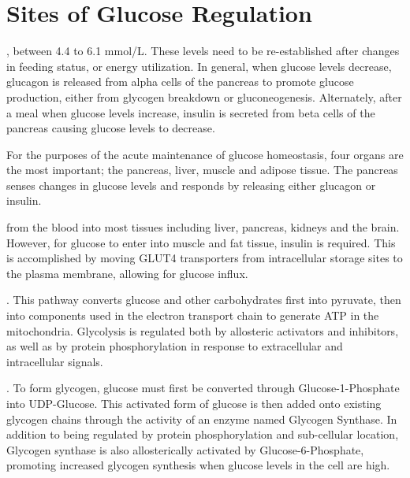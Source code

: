 \documentclass{tufte-handout}
\begin{document}
\section{Sites of Glucose Regulation}

, between 4.4 to 6.1 mmol/L.  These levels need to be re-established after changes in feeding status, or energy utilization.  In general, when glucose levels decrease, glucagon is released from alpha cells of the pancreas to promote glucose production, either from glycogen breakdown or gluconeogenesis.  Alternately, after a meal when glucose levels increase, insulin is secreted from beta cells of the pancreas causing glucose levels to decrease.

For the purposes of the acute maintenance of glucose homeostasis, four organs are the most important; the pancreas, liver, muscle and adipose tissue.  The pancreas senses changes in glucose levels and responds by releasing either glucagon or insulin. 

 from the blood into most tissues including liver, pancreas, kidneys and the brain.  However, for glucose to enter into muscle and fat tissue, insulin is required.  This is accomplished by moving GLUT4 transporters from intracellular storage sites to the plasma membrane, allowing for glucose influx.  

.  This pathway converts glucose and other carbohydrates first into pyruvate, then into components used in the electron transport chain to generate ATP in the mitochondria.  Glycolysis is regulated both by allosteric activators and inhibitors, as well as by protein phosphorylation in response to extracellular and intracellular signals.

.  To form glycogen, glucose must first be converted through Glucose-1-Phosphate into UDP-Glucose.  This activated form of glucose is then added onto existing glycogen chains through the activity of an enzyme named Glycogen Synthase.  In addition to being regulated by protein phosphorylation and sub-cellular location, Glycogen synthase is also allosterically activated by Glucose-6-Phosphate, promoting increased glycogen synthesis when glucose levels in the cell are high.
\end{document}

